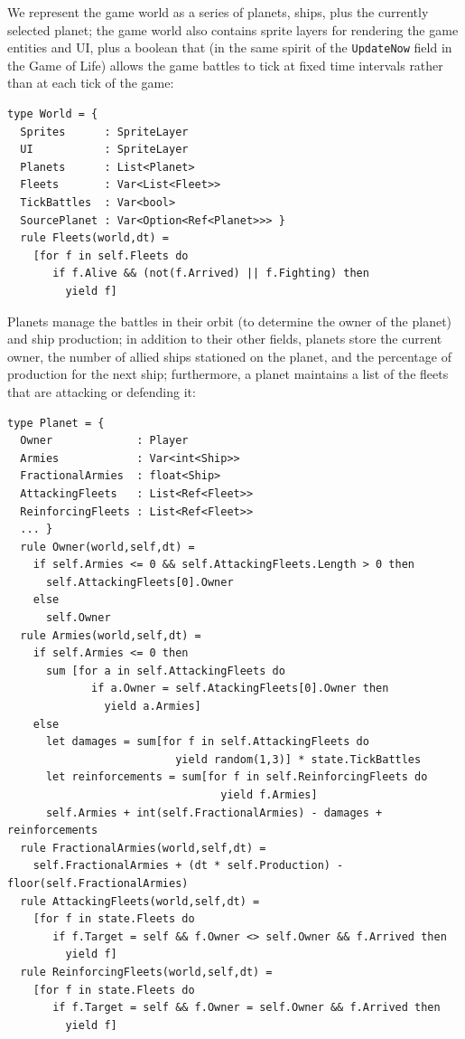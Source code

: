 We represent the game world as a series of planets, ships, plus the currently selected planet; the game world also contains sprite layers for rendering the game entities and UI, plus a boolean that (in the same spirit of the \texttt{UpdateNow} field in the Game of Life) allows the game battles to tick at fixed time intervals rather than at each tick of the game:

\begin{lstlisting}
type World = { 
  Sprites      : SpriteLayer 
  UI           : SpriteLayer 
  Planets      : List<Planet> 
  Fleets       : Var<List<Fleet>> 
  TickBattles  : Var<bool> 
  SourcePlanet : Var<Option<Ref<Planet>>> } 
  rule Fleets(world,dt) = 
    [for f in self.Fleets do
       if f.Alive && (not(f.Arrived) || f.Fighting) then
         yield f]
\end{lstlisting}

Planets manage the battles in their orbit (to determine the owner of the planet) and ship production; in addition to their other fields, planets store the current owner, the number of allied ships stationed on the planet, and the percentage of production for the next ship; furthermore, a planet maintains a list of the fleets that are attacking or defending it:

\begin{lstlisting}
type Planet = { 
  Owner             : Player
  Armies            : Var<int<Ship>>
  FractionalArmies  : float<Ship>
  AttackingFleets   : List<Ref<Fleet>>
  ReinforcingFleets : List<Ref<Fleet>>
  ... } 
  rule Owner(world,self,dt) = 
    if self.Armies <= 0 && self.AttackingFleets.Length > 0 then
      self.AttackingFleets[0].Owner 
    else 
      self.Owner 
  rule Armies(world,self,dt) = 
    if self.Armies <= 0 then 
      sum [for a in self.AttackingFleets do
             if a.Owner = self.AtackingFleets[0].Owner then
               yield a.Armies] 
    else 
      let damages = sum[for f in self.AttackingFleets do 
                          yield random(1,3)] * state.TickBattles 
      let reinforcements = sum[for f in self.ReinforcingFleets do
                                 yield f.Armies] 
      self.Armies + int(self.FractionalArmies) - damages + reinforcements 
  rule FractionalArmies(world,self,dt) = 
    self.FractionalArmies + (dt * self.Production) - floor(self.FractionalArmies) 
  rule AttackingFleets(world,self,dt) = 
    [for f in state.Fleets do
       if f.Target = self && f.Owner <> self.Owner && f.Arrived then
         yield f] 
  rule ReinforcingFleets(world,self,dt) = 
    [for f in state.Fleets do
       if f.Target = self && f.Owner = self.Owner && f.Arrived then
         yield f]
\end{lstlisting}

